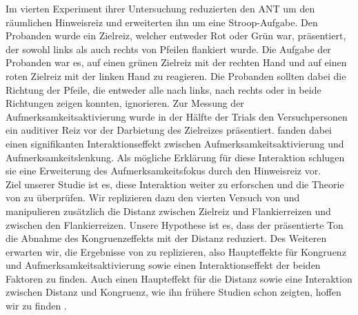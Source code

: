 Im vierten Experiment ihrer Untersuchung reduzierten  den ANT um den räumlichen Hinweisreiz und erweiterten ihn um eine Stroop-Aufgabe. Den Probanden wurde ein Zielreiz, welcher entweder Rot oder Grün war, präsentiert, der sowohl links als auch rechts von Pfeilen flankiert wurde. Die Aufgabe der Probanden war es, auf einen grünen Zielreiz mit der rechten Hand und auf einen roten Zielreiz mit der linken Hand zu reagieren. Die Probanden sollten dabei die Richtung der Pfeile, die entweder alle nach links, nach rechts oder in beide Richtungen zeigen konnten, ignorieren. Zur Messung der Aufmerksamkeitsaktivierung wurde in der Hälfte der Trials den Versuchpersonen ein auditiver Reiz vor der Darbietung des Zielreizes präsentiert.  fanden dabei einen signifikanten Interaktionseffekt zwischen Aufmerksamkeitsaktivierung und Aufmerksamkeitslenkung. Als mögliche Erklärung für diese Interaktion schlugen sie eine Erweiterung des Aufmerksamkeitsfokus durch den Hinweisreiz vor.\\
Ziel unserer Studie ist es, diese Interaktion weiter zu erforschen und die Theorie von  zu überprüfen. Wir replizieren dazu den vierten Versuch von  und manipulieren zusätzlich die Distanz zwischen Zielreiz und Flankierreizen und  zwischen den Flankierreizen. Unsere Hypothese ist es, dass der präsentierte Ton die Abnahme des Kongruenzeffekts mit der Distanz reduziert. Des Weiteren erwarten wir, die Ergebnisse von  zu replizieren, also Haupteffekte für Kongruenz und Aufmerksamkeitsaktivierung sowie einen Interaktionseffekt der beiden Faktoren zu finden. Auch einen Haupteffekt für die Distanz sowie eine Interaktion zwischen Distanz und Kongruenz, wie ihn frühere Studien schon zeigten, hoffen wir zu finden \cite{eriksen1974effects}.